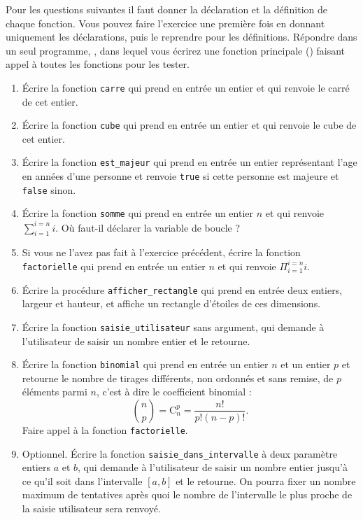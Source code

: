 Pour les questions suivantes il faut donner la déclaration et la
définition de chaque fonction. Vous pouvez faire l'exercice une
première fois en donnant uniquement les déclarations, puis le
reprendre pour les définitions. Répondre dans un seul programme, , dans
lequel vous écrirez une fonction principale () faisant appel à
toutes les fonctions pour les tester.
\begin{enumerate}
\item Écrire la fonction \verb|carre| qui prend en entrée un entier et qui renvoie le carré de cet entier.
\item Écrire la fonction \verb|cube| qui prend en entrée un entier et qui renvoie le cube de cet entier.
\item Écrire la fonction \verb|est_majeur| qui prend en entrée un entier représentant l'age en années d'une personne et renvoie \verb|true| si cette personne est majeure et \verb|false| sinon.
\item Écrire la fonction \verb|somme| qui prend en entrée un entier
  $n$ et qui renvoie $\sum_{i=1}^{i=n} i$. Où faut-il déclarer la
  variable de boucle ?
\item Si vous ne l'avez pas fait à l'exercice précédent, écrire la fonction \verb|factorielle| qui prend en entrée un entier
  $n$ et qui renvoie $\Pi_{i=1}^{i=n} i$.
\item Écrire la procédure \verb|afficher_rectangle| qui prend en
  entrée deux entiers, largeur et hauteur, et affiche un rectangle
  d'étoiles de ces dimensions.
\item Écrire la fonction \verb|saisie_utilisateur| sans argument, qui demande à l'utilisateur de saisir un nombre entier et le
  retourne.
\item Écrire la fonction \verb|binomial| qui prend en entrée un entier
  $n$ et un entier $p$ et retourne le nombre de tirages différents,
  non ordonnés et sans remise, de $p$ éléments parmi $n$, c'est à dire
  le coefficient binomial :
\[
\binom{n}{p} = \text{C}^p_n = \frac{n!}{p!(n-p)!}.
\]
Faire appel à la fonction \verb|factorielle|.
\item Optionnel. Écrire la fonction \verb|saisie_dans_intervalle| à deux
  paramètre entiers $a$ et $b$, qui demande à l'utilisateur de saisir
  un nombre entier jusqu'à ce qu'il soit dans l'intervalle $[a, b]$ et le
  retourne. On pourra fixer un nombre maximum de tentatives après quoi
  le nombre de l'intervalle le plus proche de la saisie utilisateur
  sera renvoyé.
\end{enumerate}

